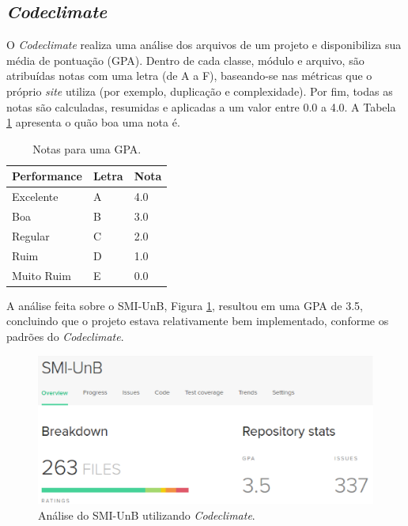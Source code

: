 \subsection{\textit{Codeclimate}}
O \textit{Codeclimate} realiza uma análise dos arquivos de um projeto e disponibiliza sua média de pontuação (GPA). Dentro de cada classe, módulo e arquivo, são atribuídas notas com uma letra (de A a F), baseando-se nas métricas que o próprio \textit{site} utiliza (por exemplo, duplicação e complexidade). Por fim, todas as notas são calculadas, resumidas e aplicadas a um valor entre 0.0 a 4.0. A Tabela \ref{gpa} apresenta o quão boa uma nota é.

\begin{table}[]
\centering
\caption{Notas para uma GPA.}
\label{gpa}
\begin{tabular}{|l|l|l|}
\hline
Performance & Letra & Nota \\ \hline
Excelente   & A     & 4.0  \\ \hline
Boa         & B     & 3.0  \\ \hline
Regular     & C     & 2.0  \\ \hline
Ruim        & D     & 1.0  \\ \hline
Muito Ruim  & E     & 0.0  \\ \hline
\end{tabular}
\end{table}

A análise feita sobre o SMI-UnB, Figura \ref{code_climate}, resultou em uma GPA de 3.5, concluindo que o projeto estava relativamente bem implementado, conforme os padrões do \textit{Codeclimate}.

\begin{figure}[!h]
    \centering
    \includegraphics[keepaspectratio=true,scale=0.5]{figuras/codeclimate.eps}
    \caption{Análise do SMI-UnB utilizando \textit{Codeclimate}.}
    \label{code_climate}
\end{figure}

